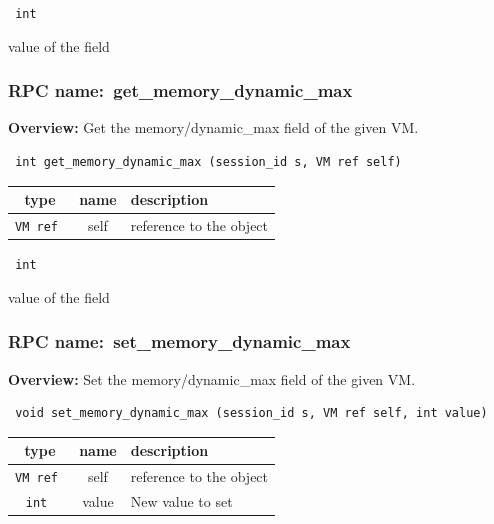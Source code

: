 \vspace{0.3cm}

{\tt 
int
}


value of the field
\vspace{0.3cm}
\vspace{0.3cm}
\vspace{0.3cm}
\subsubsection{RPC name:~get\_memory\_dynamic\_max}

{\bf Overview:} 
Get the memory/dynamic\_max field of the given VM.

\begin{verbatim} int get_memory_dynamic_max (session_id s, VM ref self)\end{verbatim}



 
\vspace{0.3cm}
\begin{tabular}{|c|c|p{7cm}|}
 \hline
{\bf type} & {\bf name} & {\bf description} \\ \hline
{\tt VM ref } & self & reference to the object \\ \hline 

\end{tabular}

\vspace{0.3cm}

{\tt 
int
}


value of the field
\vspace{0.3cm}
\vspace{0.3cm}
\vspace{0.3cm}
\subsubsection{RPC name:~set\_memory\_dynamic\_max}

{\bf Overview:} 
Set the memory/dynamic\_max field of the given VM.

\begin{verbatim} void set_memory_dynamic_max (session_id s, VM ref self, int value)\end{verbatim}



 
\vspace{0.3cm}
\begin{tabular}{|c|c|p{7cm}|}
 \hline
{\bf type} & {\bf name} & {\bf description} \\ \hline
{\tt VM ref } & self & reference to the object \\ \hline 

{\tt int } & value & New value to set \\ \hline 

\end{tabular}

